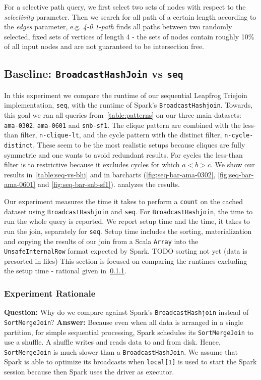 For a selective path query, we first select two sets of nodes with respect to the \textit{selectivity} parameter.
Then we search for all path of a certain length according to the \textit{edges} parameter, e.g. \textit{4-0.1-path} finds all
paths between two randomly selected, fixed sets of vertices of length 4 - the sets of nodes contain roughly 10\% of all input nodes and are not guaranteed to be intersection free.

\subsection{Baseline: \texttt{BroadcastHashJoin} vs \texttt{seq}}

In this experiment we compare the runtime of our sequential Leapfrog Triejoin implementation, \texttt{seq}, with the runtime of Spark's \texttt{BroadcastHashjoin}.
Towards, this goal we ran all queries from~\cref{table:patterns} on our three main datasets: \texttt{ama-0302}, \texttt{ama-0601} and \texttt{snb-sf1}.
The clique pattern are combined with the less-than filter, \texttt{n-clique-lt}, and the cycle pattern with the distinct filter, \texttt{n-cycle-distinct}.
These seem to be the most realistic setups because cliques are fully symmetric and one wants to avoid redundant results.
For cycles the less-than filter is to restrictive because it excludes cycles for which $a < b > c$.
We show our results in~\cref{table:seq-vs-bhj} and in barcharts (\cref{fig:seq-bar-ama-0302}, \ref{fig:seq-bar-ama-0601} and \ref{fig:seq-bar-snb-sf1}).
 analyzes the results.

Our experiment measures the time it takes to perform a \texttt{count} on the cached dataset using \texttt{BroadcastHashjoin} and \texttt{seq}.
For \texttt{BroadcastHashjoin}, the time to run the whole query is reported.
We report setup time and the time, it takes to run the join, separately for \texttt{seq}.
Setup time includes the sorting, materialization and copying the results of our join from a Scala \texttt{Array} into the \texttt{UnsafeInternalRow} format
expected by Spark.  TODO sorting not yet (data is presorted in files)
This section is focused on comparing the runtimes excluding the setup time - rational given in~\cref{sssec:seq-experiment-rational}.

\subsubsection{Experiment Rationale}\label{sssec:seq-experiment-rational}
\textbf{Question:} Why do we compare against Spark's \texttt{BroadcastHashjoin} instead of \texttt{SortMergeJoin}?
\textbf{Answer:} Because even when all data is arranged in a single partition, for simple sequential processing, Spark
schedules its \texttt{SortMergeJoin} to use a shuffle.
A shuffle writes and reads data to and from disk.
Hence, \texttt{SortMergeJoin} is much slower than a \texttt{BroadcastHashJoin}. %
We assume that Spark is able to optimize its broadcasts when \texttt{local[1]} is used to start the Spark session because then Spark uses the driver as executor.

